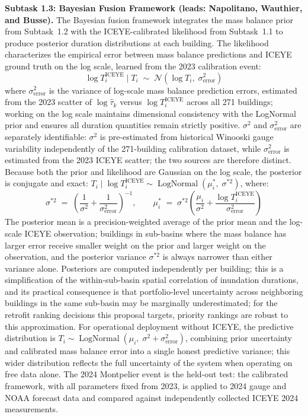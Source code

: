 \documentclass[11pt]{article}
\begin{document}
\textbf{Subtask 1.3: Bayesian Fusion Framework (leads: Napolitano, Wauthier,
and Busse).}
The Bayesian fusion framework integrates the mass balance prior from Subtask~1.2
with the ICEYE-calibrated likelihood from Subtask~1.1 to produce posterior duration
distributions at each building.
The likelihood characterizes the empirical error between mass balance predictions
and ICEYE ground truth on the log scale, learned from the 2023 calibration event:
\begin{equation}
  \log T_i^{\mathrm{ICEYE}} \mid T_i \;\sim\;
    \mathcal{N}\!\left(\log T_i,\; \sigma_{\mathrm{error}}^2\right)
\end{equation}
where $\sigma_{\mathrm{error}}^2$ is the variance of log-scale mass balance prediction
errors, estimated from the 2023 scatter of $\log\hat{\tau}_k$ versus
$\log T_i^{\mathrm{ICEYE}}$ across all 271 buildings; working on the log scale
maintains dimensional consistency with the LogNormal prior and ensures all duration
quantities remain strictly positive.
$\sigma^2$ and $\sigma_{\mathrm{error}}^2$ are separately identifiable: $\sigma^2$
is pre-estimated from historical Winooski gauge variability independently of the
271-building calibration dataset, while $\sigma_{\mathrm{error}}^2$ is estimated
from the 2023 ICEYE scatter; the two sources are therefore distinct.
Because both the prior and likelihood are Gaussian on the log scale, the posterior
is conjugate and exact: $T_i \mid \log T_i^{\mathrm{ICEYE}} \sim
\operatorname{LogNormal}(\mu_i^*,\; \sigma^{*2})$, where:
\begin{equation}
  \sigma^{*2} \;=\; \left(\frac{1}{\sigma^2} + \frac{1}{\sigma_{\mathrm{error}}^2}
    \right)^{-1}, \qquad
  \mu_i^* \;=\; \sigma^{*2}\!\left(\frac{\mu_i}{\sigma^2}
    + \frac{\log T_i^{\mathrm{ICEYE}}}{\sigma_{\mathrm{error}}^2}\right)
\end{equation}
The posterior mean is a precision-weighted average of the prior mean and the
log-scale ICEYE observation; buildings in sub-basins where the mass balance has
larger error receive smaller weight on the prior and larger weight on the
observation, and the posterior variance $\sigma^{*2}$ is always narrower than
either variance alone.
Posteriors are computed independently per building; this is a simplification of
the within-sub-basin spatial correlation of inundation durations, and its practical
consequence is that portfolio-level uncertainty across neighboring buildings in the
same sub-basin may be marginally underestimated; for the retrofit ranking decisions
this proposal targets, priority rankings are robust to this approximation.
For operational deployment without ICEYE, the predictive distribution is
$T_i \sim \operatorname{LogNormal}(\mu_i,\; \sigma^2 + \sigma_{\mathrm{error}}^2)$,
combining prior uncertainty and calibrated mass balance error into a single honest
predictive variance; this wider distribution reflects the full uncertainty of the
system when operating on free data alone.
The 2024 Montpelier event is the held-out test: the calibrated framework, with
all parameters fixed from 2023, is applied to 2024 gauge and NOAA forecast data
and compared against independently collected ICEYE 2024 measurements.
\end{document}
